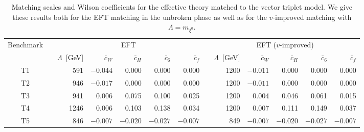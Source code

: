 \begin{table}[t] \renewcommand{\arraystretch}{1.2}
\setlength{\tabcolsep}{0.3em} \centering
    \begin{tabular}{c c rrrrr c rrrrr} \toprule
\multirow{2}{*}{Benchmark} &\hspace*{1em}& \multicolumn{5}{c}{EFT}
&\hspace*{1em}& \multicolumn{5}{c}{EFT ($v$-improved)}\\
\cmidrule{3-7} \cmidrule{9-13} && $\Lambda$~[GeV] & $\bar{c}_W$ &
$\bar{c}_H$ & $\bar{c}_6$ & $\bar{c}_f$ && $\Lambda$~[GeV] &
$\bar{c}_W$ & $\bar{c}_H$ & $\bar{c}_6$ & $\bar{c}_f$ \\ \midrule T1
&& 591 & $-0.044$ & 0.000 & 0.000 & 0.000 && 1200 & $-0.011$ & 0.000 &
0.000 & 0.000 \\ T2 && 946 & $-0.017$ & 0.000 & 0.000 & 0.000 && 1200
& $-0.011$ & 0.000 & 0.000 & 0.000 \\ T3 && 941 & 0.006 & 0.075 &
0.100 & 0.025 && 1200 & 0.004 & 0.046 & 0.061 & 0.015 \\ T4 && 1246 &
0.006 & 0.103 & 0.138 & 0.034 && 1200 & 0.007 & 0.111 & 0.149 &
0.037\\ T5 && 846 & $-0.007$ & $-0.020$ & $-0.027$ & $-0.007$ && 849 &
$-0.007$ & $-0.020$ & $-0.027$ & $-0.007$ \\ \bottomrule
    \end{tabular}
  \caption{Matching scales and Wilson coefficients for the effective
theory matched to the vector triplet model. We give these results both
for the EFT matching in the unbroken phase as well as for the
$v$-improved matching with $\Lambda = m_{\xi^0}$.}
  \label{tab:triplet_eft} \setlength{\tabcolsep}{0.5em}
\end{table}


